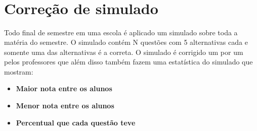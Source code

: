 \documentclass{article}
\begin{document}
\noindent{}\\\\

\noindent{}\\\\

\newpage
\section{Correção de simulado}
Todo final de semestre em uma escola é aplicado um simulado sobre toda a matéria do semestre. O simulado contém N questões com 5 alternativas cada e somente uma das alternativas é a correta. O simulado é corrigido um por um pelos professores que além disso também fazem uma estatística do simulado que mostram:

\begin{itemize}
	\item \textbf{Maior nota entre os alunos}
	\item \textbf{Menor nota entre os alunos}
	\item \textbf{Percentual que cada questão teve}
\end{itemize}
\end{document}
